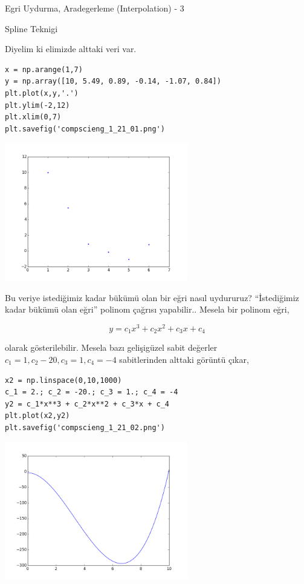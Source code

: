 \documentclass[12pt,fleqn]{article}\usepackage{../../common}
\begin{document}
Egri Uydurma, Aradegerleme (Interpolation) - 3

Spline Teknigi

Diyelim ki elimizde alttaki veri var.

\begin{verbatim}
x = np.arange(1,7)
y = np.array([10, 5.49, 0.89, -0.14, -1.07, 0.84])
plt.plot(x,y,'.')
plt.ylim(-2,12)
plt.xlim(0,7)
plt.savefig('compscieng_1_21_01.png')
\end{verbatim}

\includegraphics[height=6cm]{compscieng_1_21_01.png}

Bu veriye istediğimiz kadar bükümü olan bir eğri nasıl uydururuz?
``İstediğimiz kadar bükümü olan eğri'' polinom çağrısı yapabilir.. Mesela
bir polinom eğri,

$$ y = c_1 x^3 + c_2x^2 + c_3x + c_4 $$

olarak gösterilebilir. Mesela bazı gelişigüzel sabit değerler
$c_1=1,c_2-20,c_3=1,c_4=-4$ sabitlerinden alttaki görüntü çıkar,

\begin{verbatim}
x2 = np.linspace(0,10,1000)
c_1 = 2.; c_2 = -20.; c_3 = 1.; c_4 = -4
y2 = c_1*x**3 + c_2*x**2 + c_3*x + c_4
plt.plot(x2,y2)
plt.savefig('compscieng_1_21_02.png')
\end{verbatim}

\includegraphics[height=6cm]{compscieng_1_21_02.png}
\end{document}
